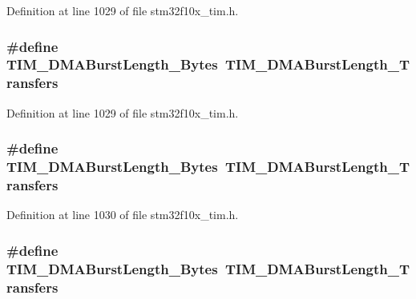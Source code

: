 Definition at line 1029 of file stm32f10x\+\_\+tim.\+h.

\subsubsection[{\texorpdfstring{T\+I\+M\+\_\+\+D\+M\+A\+Burst\+Length\+\_\+10\+Bytes}{TIM_DMABurstLength_10Bytes}}]{\setlength{\rightskip}{0pt plus 5cm}\#define T\+I\+M\+\_\+\+D\+M\+A\+Burst\+Length\+\_\+Bytes~{\bf T\+I\+M\+\_\+\+D\+M\+A\+Burst\+Length\+\_\+Transfers}}\hypertarget{group___t_i_m___legacy_ga99141ca3210700d07d098d161b42cdf3}{}\label{group___t_i_m___legacy_ga99141ca3210700d07d098d161b42cdf3}


Definition at line 1029 of file stm32f10x\+\_\+tim.\+h.

\subsubsection[{\texorpdfstring{T\+I\+M\+\_\+\+D\+M\+A\+Burst\+Length\+\_\+11\+Bytes}{TIM_DMABurstLength_11Bytes}}]{\setlength{\rightskip}{0pt plus 5cm}\#define T\+I\+M\+\_\+\+D\+M\+A\+Burst\+Length\+\_\+Bytes~{\bf T\+I\+M\+\_\+\+D\+M\+A\+Burst\+Length\+\_\+Transfers}}\hypertarget{group___t_i_m___legacy_ga1a4ab1c8a8469f0d28aafb902615f6db}{}\label{group___t_i_m___legacy_ga1a4ab1c8a8469f0d28aafb902615f6db}


Definition at line 1030 of file stm32f10x\+\_\+tim.\+h.

\subsubsection[{\texorpdfstring{T\+I\+M\+\_\+\+D\+M\+A\+Burst\+Length\+\_\+11\+Bytes}{TIM_DMABurstLength_11Bytes}}]{\setlength{\rightskip}{0pt plus 5cm}\#define T\+I\+M\+\_\+\+D\+M\+A\+Burst\+Length\+\_\+Bytes~{\bf T\+I\+M\+\_\+\+D\+M\+A\+Burst\+Length\+\_\+Transfers}}\hypertarget{group___t_i_m___legacy_ga1a4ab1c8a8469f0d28aafb902615f6db}{}\label{group___t_i_m___legacy_ga1a4ab1c8a8469f0d28aafb902615f6db}


